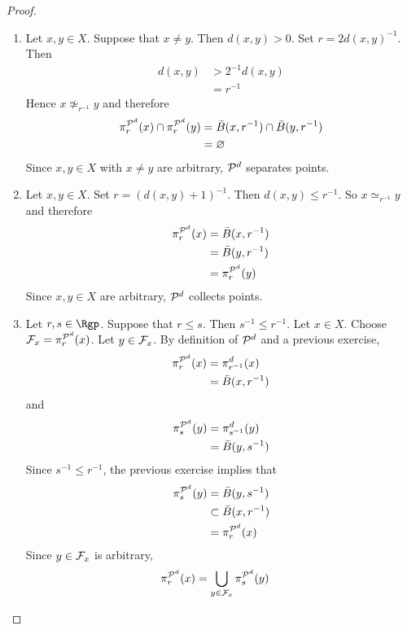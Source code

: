 \documentclass{book}
\begin{document}
\begin{proof}\
	\begin{enumerate}
		\item Let $x, y \in X$. Suppose that $x \neq y$. Then $d(x,y) > 0$. Set $r = 2d(x,y)^{-1}$. Then 
		\begin{align*}
			d(x,y) 
			& > 2^{-1}d(x,y) \\
			& = r^{-1}
		\end{align*}
		Hence $x \not \simeq_{r^{-1}} y$ and therefore 
		\begin{align*}
			\pi^{\mathcal{P}^d}_r(x) \cap \pi^{\mathcal{P}^d}_r(y)
			& = \bar{B}(x, r^{-1}) \cap \bar{B}(y, r^{-1}) \\
			& = \varnothing
		\end{align*}
		Since $x,y \in X$ with $x \neq y$ are arbitrary, $\mathcal{P}^d$ separates points.
		\item Let $x,y \in X$. Set $r = (d(x,y) + 1)^{-1}$. Then $d(x,y) \leq r^{-1}$. So $x \simeq_{r^{-1}} y$ and therefore
		\begin{align*}
			\pi^{\mathcal{P}^d}_{r}(x) 
			& = \bar{B}(x, r^{-1}) \\
			& = \bar{B}(y,r^{-1}) \\
			& = \pi^{\mathcal{P}^d}_{r}(y) 
		\end{align*}
		Since $x,y \in X$ are arbitrary, $\mathcal{P}^d$ collects points.
		\item Let $r,s \in \Rgp$. Suppose that $r \leq s$. Then $s^{-1} \leq r^{-1}$. Let $x \in X$. Choose $\mathcal{F}_x = \pi^{\mathcal{P}^d}_r(x)$. Let $y \in \mathcal{F}_x$. By definition of $\mathcal{P}^d$ and a previous exercise,  
		\begin{align*}
			\pi^{\mathcal{P}^d}_r(x) 
			& = \pi^d_{r^{-1}}(x) \\
			& = \bar{B}(x, r^{-1})
		\end{align*}
		and 
		\begin{align*}
			\pi^{\mathcal{P}^d}_s(y) 
			& = \pi^d_{s^{-1}}(y) \\
			& = \bar{B}(y, s^{-1})
		\end{align*}
		Since $s^{-1} \leq r^{-1}$, the previous exercise implies that 
		\begin{align*}
			\pi^{\mathcal{P}^d}_s(y) 
			& = \bar{B}(y, s^{-1}) \\
			& \subset \bar{B}(x, r^{-1}) \\
			& = \pi^{\mathcal{P}^d}_r(x) 
		\end{align*} 
		Since $y \in \mathcal{F}_x$ is arbitrary, 
		\begin{align*}
			\pi^{\mathcal{P}^d}_r(x)
			& = \bigcup_{y \in \mathcal{F}_x} \pi^{\mathcal{P}^d}_s(y) 
		\end{align*}

\end{enumerate}
\end{proof}
\end{document}
